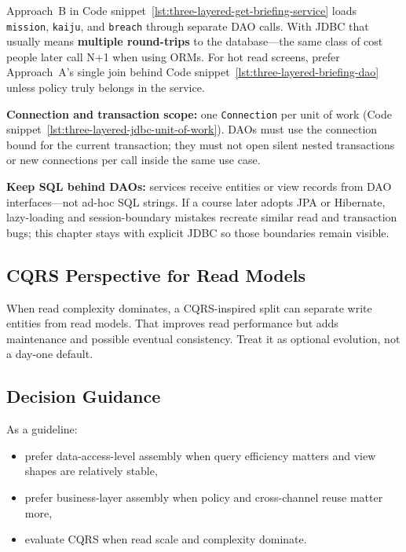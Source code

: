 Approach~B in Code snippet~\ref{lst:three-layered-get-briefing-service} loads \texttt{mission}, \texttt{kaiju}, and \texttt{breach} through separate DAO calls. With JDBC that usually means \textbf{multiple round-trips} to the database---the same class of cost people later call N+1 when using ORMs. For hot read screens, prefer Approach~A's single join behind Code snippet~\ref{lst:three-layered-briefing-dao} unless policy truly belongs in the service.

\textbf{Connection and transaction scope:} one \texttt{Connection} per unit of work (Code snippet~\ref{lst:three-layered-jdbc-unit-of-work}). DAOs must use the connection bound for the current transaction; they must not open silent nested transactions or new connections per call inside the same use case.

\textbf{Keep SQL behind DAOs:} services receive entities or view records from DAO interfaces---not ad-hoc SQL strings. If a course later adopts JPA or Hibernate, lazy-loading and session-boundary mistakes recreate similar read and transaction bugs; this chapter stays with explicit JDBC so those boundaries remain visible.

\subsection{CQRS Perspective for Read Models}
\label{sec:three_layered_view_assembly_cqrs}

When read complexity dominates, a CQRS-inspired split can separate write entities from read models. That improves read performance but adds maintenance and possible eventual consistency. Treat it as optional evolution, not a day-one default.

\subsection{Decision Guidance}
\label{sec:three_layered_view_assembly_guidance}

As a guideline:
\begin{itemize}
    \item prefer data-access-level assembly when query efficiency matters and view shapes are relatively stable,
    \item prefer business-layer assembly when policy and cross-channel reuse matter more,
    \item evaluate CQRS when read scale and complexity dominate.
\end{itemize}

